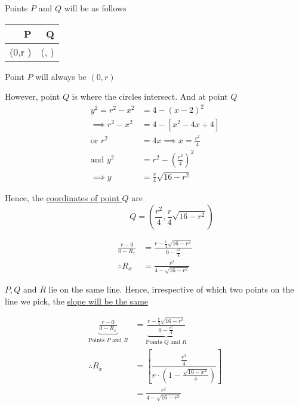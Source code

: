 \documentclass[14pt,fleqn]{extarticle}
\newcommand\xq{\frac{r^2}{4}}
\newcommand\yq{\frac{r}{4}\sqrt{16-r^2}}
\newcommand\rx{\frac{r^2}{4-\sqrt{16-r^2}}}
\begin{document}
\begin{problem}
\begin{step}
\begin{options}
     \incorrect

Points $P$ and $Q$ will be as follows 
      
      \begin{center}
  \begin{tabular}{NN}
   \toprule
        P & Q \\
   \midrule 
   \left(0,r \right) & \left(, \right) \\
    \bottomrule
  \end{tabular}
\end{center}

        
    \end{options} 
     \reason 
     
     Point $P$ will always be $(0,r)$ \newline 
     
     However, point $Q$ is where the circles intersect. And at point $Q$ 
     \begin{align}
     y^2 = r^2 - x^2 &= 4 - (x-2)^2 \\
     \implies r^2 - x^2 &= 4 - \left[x^2 - 4x + 4 \right] \\
     \text{or } r^2 &= 4x \implies x = \frac{r^2}{4} \\
     \text{and } y^2 &= r^2 - \left(\frac{r^2}{4} \right)^2 \\
     \implies y &= \yq 
\end{align}

Hence, the \underline{coordinates of point $Q$} are 
\[ \qquad\qquad Q = \left(\xq,\yq \right)\]
       
\end{step}

\begin{step}
  \begin{options} 
     \correct 
       
       \begin{align}
	\frac{r-0}{0-R_x} &= \frac{r-\yq}{0-\xq} \\
	\therefore R_x &= \frac{r^2}{4-\sqrt{16-r^2}}
\end{align}

        
    \end{options} 
     \reason 
     
     $P,Q$ and $R$ lie on the same line. Hence, irrespective of which two points on the line we pick, the \underline{slope will be the same}
     
     \begin{align}
     \underbrace{\frac{r-0}{0-R_x}}_{\text{Points $P$ and $R$}} &= 
     \underbrace{\frac{r-\yq}{0-\xq}}_{\text{Points $Q$ and $R$}} \\
     \therefore R_x &= \left[\dfrac{\frac{r^3}{4}}{r\cdot \left(1-\frac{\sqrt{16-x^2}}{4} \right)} \right] \\
     &= \rx
\end{align}
       

\end{step}
\end{problem}
\end{document}
